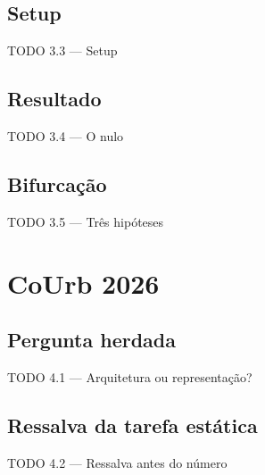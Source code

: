 \documentclass{beamer}
\begin{document}
\subsection{Setup}
\begin{frame}{TODO 3.3 --- Setup}
\end{frame}

\subsection{Resultado}
\begin{frame}{TODO 3.4 --- O nulo}
\end{frame}

\subsection{Bifurcação}
\begin{frame}{TODO 3.5 --- Três hipóteses}
\end{frame}


\section{CoUrb 2026}

\subsection{Pergunta herdada}
\begin{frame}{TODO 4.1 --- Arquitetura ou representação?}
\end{frame}

\subsection{Ressalva da tarefa estática}
\begin{frame}{TODO 4.2 --- Ressalva antes do número}
\end{frame}
\end{document}
